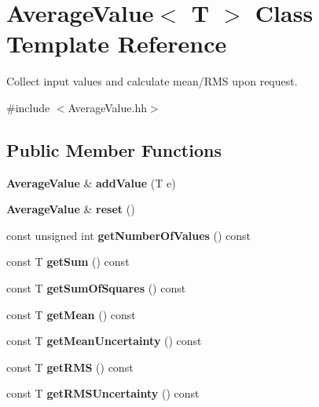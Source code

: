 \section{Average\-Value$<$ T $>$ Class Template Reference}
\label{classAverageValue}


Collect input values and calculate mean/\-R\-M\-S upon request.  




{\ttfamily \#include $<$Average\-Value.\-hh$>$}

\subsection*{Public Member Functions}
\begin{DoxyCompactItemize}
\item 
{\bf Average\-Value} \& {\bfseries add\-Value} (T e)\label{classAverageValue_a761e96e88901b8660ed3144e62111d1e}

\item 
{\bf Average\-Value} \& {\bfseries reset} ()\label{classAverageValue_a8402a0c0c5684e70ab5b2f01d316d695}

\item 
const unsigned int {\bfseries get\-Number\-Of\-Values} () const \label{classAverageValue_a8ec1cb0f2a04a199f8993025859573e1}

\item 
const T {\bfseries get\-Sum} () const \label{classAverageValue_a7b92383c27eb1897f0fa4ab9b48dc7d6}

\item 
const T {\bfseries get\-Sum\-Of\-Squares} () const \label{classAverageValue_a085cb76103bddc0030d95d704f5913b1}

\item 
const T {\bfseries get\-Mean} () const \label{classAverageValue_af500336a4650b1ee612e39dfa06687e4}

\item 
const T {\bfseries get\-Mean\-Uncertainty} () const \label{classAverageValue_a0dd1de27ea460d4c77f807e95b554589}

\item 
const T {\bfseries get\-R\-M\-S} () const \label{classAverageValue_a463d2278f5223cae4c2d4aafbbbbd390}

\item 
const T {\bfseries get\-R\-M\-S\-Uncertainty} () const \label{classAverageValue_a746c0c5ca150856c7f0a3b4dbe0e9906}

\end{DoxyCompactItemize}
